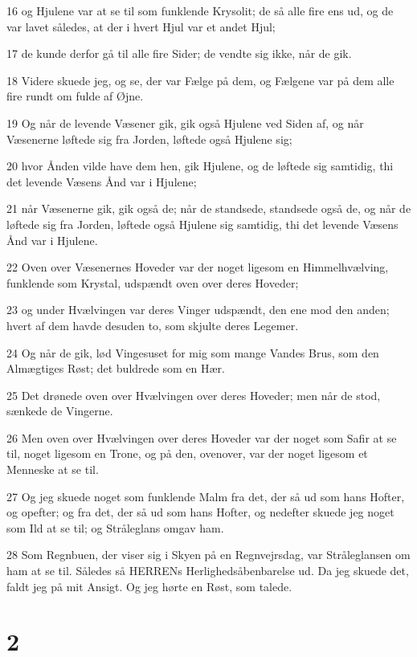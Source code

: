 \par 16 og Hjulene var at se til som funklende Krysolit; de så alle fire ens ud, og de var lavet således, at der i hvert Hjul var et andet Hjul;
\par 17 de kunde derfor gå til alle fire Sider; de vendte sig ikke, når de gik.
\par 18 Videre skuede jeg, og se, der var Fælge på dem, og Fælgene var på dem alle fire rundt om fulde af Øjne.
\par 19 Og når de levende Væsener gik, gik også Hjulene ved Siden af, og når Væsenerne løftede sig fra Jorden, løftede også Hjulene sig;
\par 20 hvor Ånden vilde have dem hen, gik Hjulene, og de løftede sig samtidig, thi det levende Væsens Ånd var i Hjulene;
\par 21 når Væsenerne gik, gik også de; når de standsede, standsede også de, og når de løftede sig fra Jorden, løftede også Hjulene sig samtidig, thi det levende Væsens Ånd var i Hjulene.
\par 22 Oven over Væsenernes Hoveder var der noget ligesom en Himmelhvælving, funklende som Krystal, udspændt oven over deres Hoveder;
\par 23 og under Hvælvingen var deres Vinger udspændt, den ene mod den anden; hvert af dem havde desuden to, som skjulte deres Legemer.
\par 24 Og når de gik, lød Vingesuset for mig som mange Vandes Brus, som den Almægtiges Røst; det buldrede som en Hær.
\par 25 Det drønede oven over Hvælvingen over deres Hoveder; men når de stod, sænkede de Vingerne.
\par 26 Men oven over Hvælvingen over deres Hoveder var der noget som Safir at se til, noget ligesom en Trone, og på den, ovenover, var der noget ligesom et Menneske at se til.
\par 27 Og jeg skuede noget som funklende Malm fra det, der så ud som hans Hofter, og opefter; og fra det, der så ud som hans Hofter, og nedefter skuede jeg noget som Ild at se til; og Stråleglans omgav ham.
\par 28 Som Regnbuen, der viser sig i Skyen på en Regnvejrsdag, var Stråleglansen om ham at se til. Således så HERRENs Herlighedsåbenbarelse ud. Da jeg skuede det, faldt jeg på mit Ansigt. Og jeg hørte en Røst, som talede.

\chapter{2}

